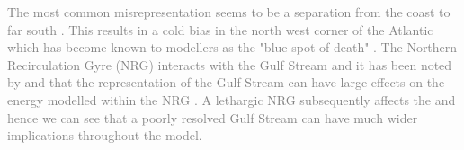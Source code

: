 \documentclass[..\EOYR.tex]{subfiles}
\begin{document}
\textcolor{gray}{
    The most common misrepresentation seems to be a separation from the coast to far south . This results in a cold bias in the north west corner of the Atlantic which has become known to modellers as the "blue spot of death" \citep{Gnanadesikan2007}.   The Northern Recirculation Gyre (NRG) interacts with the Gulf Stream and it has been noted by \citep{Zhang2007} and \citep{Ezer2016b} that the representation of the Gulf Stream can have large effects on the energy modelled within the NRG . A lethargic NRG subsequently affects the  and hence we can see that a poorly resolved Gulf Stream can have much wider implications throughout the model.} 
\end{document}
